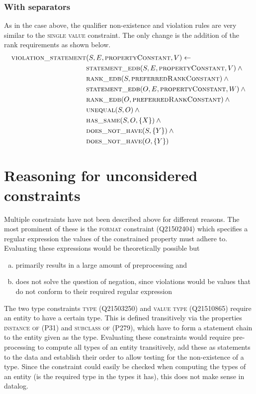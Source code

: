 \documentclass[hyperref,bachelorofscience,fleqn]{cgvpub}
\begin{document}
\subsubsection{With separators}
As in the case above, the qualifier non-existence and violation rules are very similar to the \textsc{single value} constraint. The only change is the addition of the rank requirements as shown below.
\begin{align}
\begin{split}
\textsc{violation\_statement}&(S, E, \textsc{propertyConstant}, V) \leftarrow \\
&\textsc{statement\_edb}(S, E, \textsc{propertyConstant}, V) \wedge{} \\
&\textsc{rank\_edb}(S, \textsc{preferredRankConstant}) \wedge{} \\
&\textsc{statement\_edb}(O, E, \textsc{propertyConstant}, W) \wedge{} \\
&\textsc{rank\_edb}(O, \textsc{preferredRankConstant}) \wedge{} \\
&\textsc{unequal}(S, O) \wedge{} \\
&\textsc{has\_same}(S, O, \{X\}) \wedge{} \\
&\textsc{does\_not\_have}(S, \{Y\}) \wedge{} \\
&\textsc{does\_not\_have}(O, \{Y\})
\end{split}
\end{align}

\section{Reasoning for unconsidered constraints}
Multiple constraints have not been described above for different reasons. The most prominent of these is the \textsc{format} constraint (Q21502404) which specifies a regular expression the values of the constrained property must adhere to. Evaluating these expressions would be theoretically possible but \\
\begin{enumerate}[a)]
\item primarily results in a large amount of preprocessing and
\item does not solve the question of negation, since violations would be values that do not conform to their required regular expression
\end{enumerate}

The two type constraints \textsc{type} (Q21503250) and \textsc{value type} (Q21510865) require an entity to have a certain type. This is defined transitively via the properties \textsc{instance of} (P31) and \textsc{subclass of} (P279), which have to form a statement chain to the entity given as the type. Evaluating these constraints would require pre-processing to compute all types of an entity transitively, add these as statements to the data and establish their order to allow testing for the non-existence of a type. Since the constraint could easily be checked when computing the types of an entity (is the required type in the types it has), this does not make sense in datalog.
\end{document}
